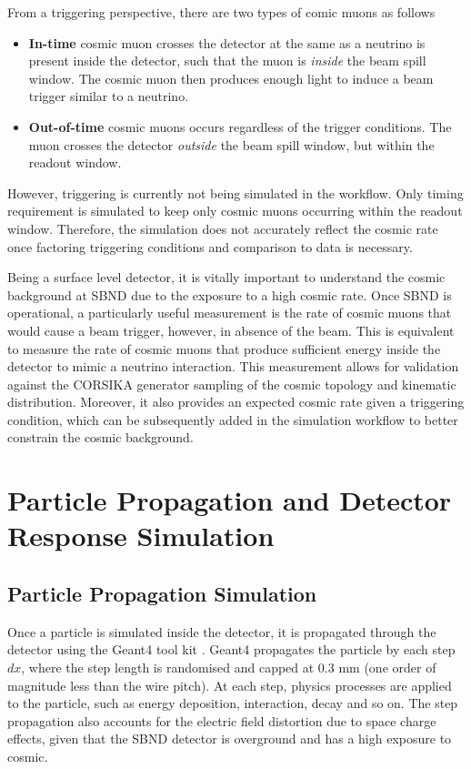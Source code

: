 From a triggering perspective, there are two types of comic muons as follows 
\begin{itemize}
	\item\textbf{In-time} cosmic muon crosses the detector at the same as a neutrino is present inside the detector, such that the muon is \textit{inside} the beam spill window. The cosmic muon then produces enough light to induce a beam trigger similar to a neutrino.
	\item\textbf{Out-of-time} cosmic muons occurs regardless of the trigger conditions. The muon crosses the detector \textit{outside} the beam spill window, but within the readout window.
\end{itemize}
However, triggering is currently not being simulated in the workflow. 
Only timing requirement is simulated to keep only cosmic muons occurring within the readout window.
Therefore, the simulation does not accurately reflect the cosmic rate once factoring triggering conditions and comparison to data is necessary. 

Being a surface level detector, it is vitally important to understand the cosmic background at SBND due to the exposure to a high cosmic rate.
Once SBND is operational, a particularly useful measurement is the rate of cosmic muons that would cause a beam trigger, however, in absence of the beam.
This is equivalent to measure the rate of cosmic muons that produce sufficient energy inside the detector to mimic a neutrino interaction.
This measurement allows for validation against the CORSIKA generator sampling of the cosmic topology and kinematic distribution. 
Moreover, it also provides an expected cosmic rate given a triggering condition, which can be subsequently added in the simulation workflow to better constrain the cosmic background.

\section{Particle Propagation and Detector Response Simulation}
\label{sec:gen_response}

\subsection{Particle Propagation Simulation}
\label{sec:gen_g4}

Once a particle is simulated inside the detector, it is propagated through the detector using the Geant4 tool kit \cite{geant4}.
Geant4 propagates the particle by each step $dx$, where the step length is randomised and capped at 0.3 mm (one order of magnitude less than the wire pitch).
At each step, physics processes are applied to the particle, such as energy deposition, interaction, decay and so on.
The step propagation also accounts for the electric field distortion due to space charge effects, given that the SBND detector is overground and has a high exposure to cosmic.

